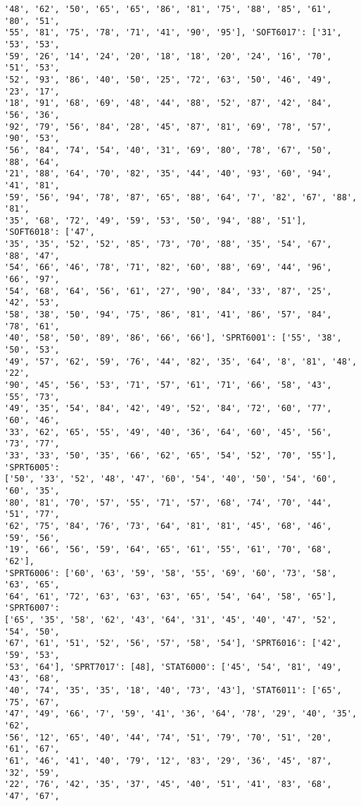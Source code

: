 \documentclass[11pt]{article}
\begin{document}
\begin{Verbatim}[commandchars=\\\{\}]
'48', '62', '50', '65', '65', '86', '81', '75', '88', '85', '61', '80', '51',
'55', '81', '75', '78', '71', '41', '90', '95'], 'SOFT6017': ['31', '53', '53',
'59', '26', '14', '24', '20', '18', '18', '20', '24', '16', '70', '51', '53',
'52', '93', '86', '40', '50', '25', '72', '63', '50', '46', '49', '23', '17',
'18', '91', '68', '69', '48', '44', '88', '52', '87', '42', '84', '56', '36',
'92', '79', '56', '84', '28', '45', '87', '81', '69', '78', '57', '90', '53',
'56', '84', '74', '54', '40', '31', '69', '80', '78', '67', '50', '88', '64',
'21', '88', '64', '70', '82', '35', '44', '40', '93', '60', '94', '41', '81',
'59', '56', '94', '78', '87', '65', '88', '64', '7', '82', '67', '88', '81',
'35', '68', '72', '49', '59', '53', '50', '94', '88', '51'], 'SOFT6018': ['47',
'35', '35', '52', '52', '85', '73', '70', '88', '35', '54', '67', '88', '47',
'54', '66', '46', '78', '71', '82', '60', '88', '69', '44', '96', '66', '97',
'54', '68', '64', '56', '61', '27', '90', '84', '33', '87', '25', '42', '53',
'58', '38', '50', '94', '75', '86', '81', '41', '86', '57', '84', '78', '61',
'40', '58', '50', '89', '86', '66', '66'], 'SPRT6001': ['55', '38', '50', '53',
'49', '57', '62', '59', '76', '44', '82', '35', '64', '8', '81', '48', '22',
'90', '45', '56', '53', '71', '57', '61', '71', '66', '58', '43', '55', '73',
'49', '35', '54', '84', '42', '49', '52', '84', '72', '60', '77', '60', '46',
'33', '62', '65', '55', '49', '40', '36', '64', '60', '45', '56', '73', '77',
'33', '33', '50', '35', '66', '62', '65', '54', '52', '70', '55'], 'SPRT6005':
['50', '33', '52', '48', '47', '60', '54', '40', '50', '54', '60', '60', '35',
'80', '81', '70', '57', '55', '71', '57', '68', '74', '70', '44', '51', '77',
'62', '75', '84', '76', '73', '64', '81', '81', '45', '68', '46', '59', '56',
'19', '66', '56', '59', '64', '65', '61', '55', '61', '70', '68', '62'],
'SPRT6006': ['60', '63', '59', '58', '55', '69', '60', '73', '58', '63', '65',
'64', '61', '72', '63', '63', '63', '65', '54', '64', '58', '65'], 'SPRT6007':
['65', '35', '58', '62', '43', '64', '31', '45', '40', '47', '52', '54', '50',
'67', '61', '51', '52', '56', '57', '58', '54'], 'SPRT6016': ['42', '59', '53',
'53', '64'], 'SPRT7017': [48], 'STAT6000': ['45', '54', '81', '49', '43', '68',
'40', '74', '35', '35', '18', '40', '73', '43'], 'STAT6011': ['65', '75', '67',
'47', '49', '66', '7', '59', '41', '36', '64', '78', '29', '40', '35', '62',
'56', '12', '65', '40', '44', '74', '51', '79', '70', '51', '20', '61', '67',
'61', '46', '41', '40', '79', '12', '83', '29', '36', '45', '87', '32', '59',
'22', '76', '42', '35', '37', '45', '40', '51', '41', '83', '68', '47', '67',

\end{Verbatim}
\end{document}
